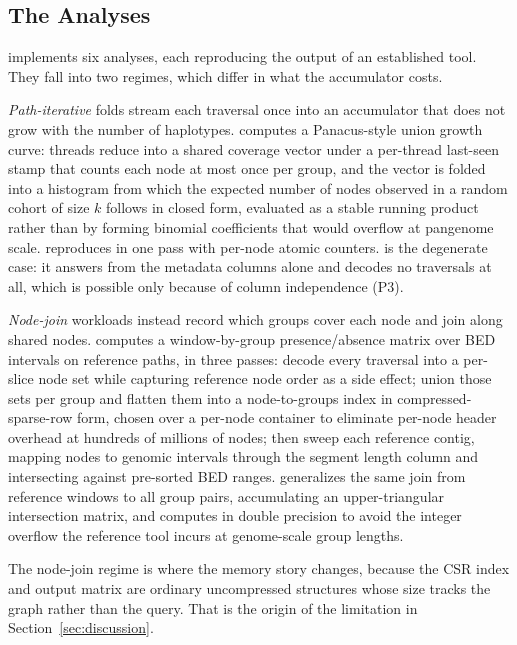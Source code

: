 \subsection{The Analyses}
\label{subsec:eng-instances}

\sys implements six analyses, each reproducing the output of an established tool.
They fall into two regimes, which differ in what the accumulator costs.

\emph{Path-iterative} folds stream each traversal once into an accumulator that
does not grow with the number of haplotypes.  computes a
Panacus-style union growth curve: threads reduce into a shared coverage vector
under a per-thread last-seen stamp that counts each node at most once per group,
and the vector is folded into a histogram from which the expected number of nodes
observed in a random cohort of size $k$ follows in closed form, evaluated as a
stable running product rather than by forming binomial coefficients that would
overflow at pangenome scale.  reproduces  in one pass
with per-node atomic counters.  is the degenerate case: it answers
from the metadata columns alone and decodes no traversals at all, which is
possible only because of column independence (P3).

\emph{Node-join} workloads instead record which groups cover each node and join
along shared nodes.  computes a window-by-group presence/absence matrix
over BED intervals on reference paths, in three passes: decode every traversal
into a per-slice node set while capturing reference node order as a side effect;
union those sets per group and flatten them into a node-to-groups index in
compressed-sparse-row form, chosen over a per-node container to eliminate
per-node header overhead at hundreds of millions of nodes; then sweep each
reference contig, mapping nodes to genomic intervals through the segment length
column and intersecting against pre-sorted BED ranges. 
generalizes the same join from reference windows to all group pairs, accumulating
an upper-triangular intersection matrix, and computes in double precision to avoid
the integer overflow the reference tool incurs at genome-scale group lengths.

The node-join regime is where the memory story changes, because the CSR index and
output matrix are ordinary uncompressed structures whose size tracks the graph
rather than the query. That is the origin of the limitation in
Section~\ref{sec:discussion}.

